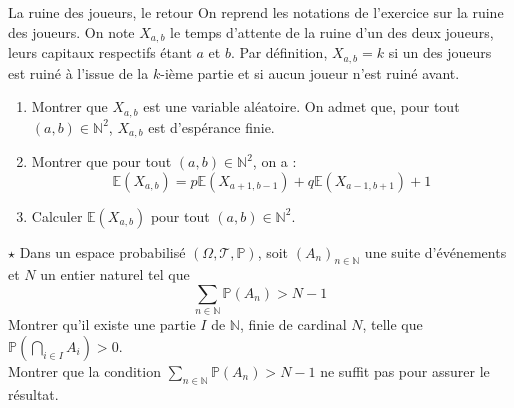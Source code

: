 \documentclass[french,a4paper]{article}
\renewcommand{\P}{\mathbb{P}}
\newcommand{\N}{\mathbb{N}}
\newcommand{\E}{\mathbb{E}}
\theoremstyle{plain}
\theoremstyle{definition}
\theoremstyle{remark}
\begin{document}
\begin{ex}[Moulin.57]{La ruine des joueurs, le retour}
	On reprend les notations de l'exercice sur la ruine des joueurs. On note $X_{a,b}$ le temps d'attente de la ruine d'un des deux joueurs, leurs capitaux respectifs étant $a$ et $b$. Par définition, $X_{a,b}=k$ si un des joueurs est ruiné à l'issue de la $k$-ième partie et si aucun joueur n'est ruiné avant.
	\begin{enumerate}
		\item Montrer que $X_{a,b}$ est une variable aléatoire. On admet que, pour tout $(a,b)\in\N^2$, $X_{a,b}$ est d'espérance finie.
		\item Montrer que pour tout $(a,b)\in\N^2$, on a : $$\E(X_{a,b})=p\E(X_{a+1,b-1})+q\E(X_{a-1,b+1})+1$$
		\item Calculer $\E(X_{a,b})$ pour tout $(a,b)\in\N^2$.
	\end{enumerate}
\end{ex}

\begin{ex}[Moulin.58]{$\star$}
	Dans un espace probabilisé $(\Omega,\mathcal{T},\P)$, soit $(A_n)_{n\in\N}$ une suite d'événements et $N$ un entier naturel tel que $$\sum_{n\in\N}\P(A_n)>N-1$$ Montrer qu'il existe une partie $I$ de $\N$, finie de cardinal $N$, telle que $\P\displaystyle\left(\bigcap_{i\in I}A_i\right)>0$. \\ Montrer que la condition $\displaystyle\sum_{n\in\N}\P(A_n)>N-1$ ne suffit pas pour assurer le résultat.
\end{ex}
\end{document}
